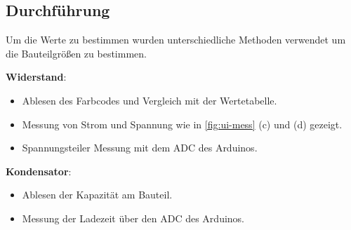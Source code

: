 \subsection{Durchführung}

Um die Werte zu bestimmen wurden unterschiedliche Methoden verwendet um die Bauteilgrößen zu bestimmen.

\begin{minipage}[t]{0.49\textwidth}
    \textbf{Widerstand}:
    \begin{itemize}[nolistsep, noitemsep]
        \item Ablesen des Farbcodes und Vergleich mit der Wertetabelle.
        \item Messung von Strom und Spannung wie in \autoref{fig:ui-mess} (c) und (d) gezeigt.
        \item Spannungsteiler Messung mit dem ADC des Arduinos.
    \end{itemize}
\end{minipage}\hfill
\begin{minipage}[t]{0.49\textwidth}
    \textbf{Kondensator}:
    \begin{itemize}[nolistsep, noitemsep]
        \item Ablesen der Kapazität am Bauteil.
        \item Messung der Ladezeit über den ADC des Arduinos.
    \end{itemize}
\end{minipage}


